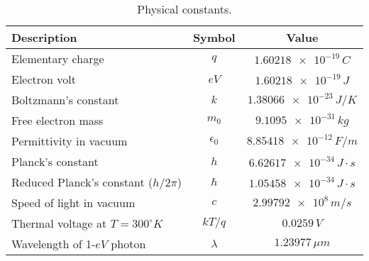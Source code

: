     \begin{table}[H]
        \centering
        \setlength{\tabcolsep}{20pt}
        \renewcommand{\arraystretch}{1.5}
        \begin{tabular}{|l|c|c|}
            \hline
            \textbf{Description}  &  \textbf{Symbol} & \textbf{Value}\\
            \hline
            Elementary charge & $q$ & $\num{1.60218e-19}\,C$\\
            \hline
            Electron volt & $eV$ & $\num{1.60218e-19}\,J$\\
            \hline
            Boltzmann's constant & $k$ & $\num{1.38066e-23}\,J/K$\\
            \hline
            Free electron mass & $m_0$ & $\num{9.1095e-31}\,kg$\\
            \hline
            Permittivity in vacuum & $\epsilon_0$ & $\num{8.85418e-12}\,F/m$\\
            \hline
            Planck's constant & $h$ & $\num{6.62617e-34}\,J \cdot s$\\
            \hline
            Reduced Planck's constant ($h/2\pi$) & $\hslash$ & $\num{1.05458e-34}\,J \cdot s$\\
            \hline
            Speed of light in vacuum & $c$ & $\num{2.99792e8}\,m/s$\\
            \hline
            Thermal voltage at $T=300^{\circ}K$ & $kT/q$ & $0.0259\,V$\\
            \hline
            Wavelength of 1-$eV$ photon & $\lambda$ & $1.23977\,\mu m$\\
            \hline
        \end{tabular}
        \caption{Physical constants.
        \label{tab:phys_const}} 
    \end{table}
\newpage
